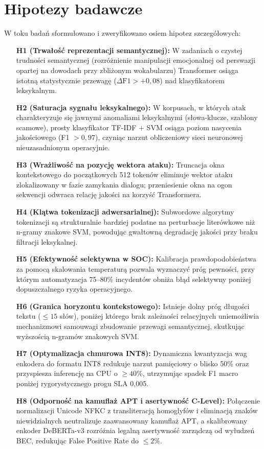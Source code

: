 \documentclass[12pt,a4paper,twoside]{report}
\begin{document}
\section{Hipotezy badawcze}
W toku badań sformułowano i zweryfikowano osiem hipotez szczegółowych:
\begin{itemize}[leftmargin=*]
  \item[\textbf{H1 (Trwałość reprezentacji semantycznej):}] W zadaniach o czystej trudności semantycznej (rozróżnienie manipulacji emocjonalnej od perswazji opartej na dowodach przy zbliżonym wokabularzu) Transformer osiąga istotną statystycznie przewagę ($\Delta \text{F1} > +0,08$) nad klasyfikatorem leksykalnym.
  \item[\textbf{H2 (Saturacja sygnału leksykalnego):}] W korpusach, w których atak charakteryzuje się jawnymi anomaliami leksykalnymi (słowa-klucze, szablony scamowe), prosty klasyfikator TF-IDF + SVM osiąga poziom nasycenia jakościowego (F1 $> 0,97$), czyniąc narzut obliczeniowy sieci neuronowej nieuzasadnionym operacyjnie.
  \item[\textbf{H3 (Wrażliwość na pozycję wektora ataku):}] Truncacja okna kontekstowego do początkowych 512 tokenów eliminuje wektor ataku zlokalizowany w fazie zamykania dialogu; przeniesienie okna na ogon sekwencji odwraca relację jakości na korzyść Transformera.
  \item[\textbf{H4 (Klątwa tokenizacji adwersarialnej):}] Subwordowe algorytmy tokenizacji są strukturalnie bardziej podatne na perturbacje literówkowe niż n-gramy znakowe SVM, powodując gwałtowną degradację jakości przy braku filtracji leksykalnej.
  \item[\textbf{H5 (Efektywność selektywna w SOC):}] Kalibracja prawdopodobieństwa za pomocą skalowania temperaturą pozwala wyznaczyć próg pewności, przy którym automatyzacja 75--80\% incydentów obniża błąd selektywny poniżej dopuszczalnego ryzyka operacyjnego.
  \item[\textbf{H6 (Granica horyzontu kontekstowego):}] Istnieje dolny próg długości tekstu ($\le 15$ słów), poniżej którego brak zależności relacyjnych uniemożliwia mechanizmowi samouwagi zbudowanie przewagi semantycznej, skutkując wyższością n-gramów znakowych SVM.
  \item[\textbf{H7 (Optymalizacja chmurowa INT8):}] Dynamiczna kwantyzacja wag enkodera do formatu INT8 redukuje narzut pamięciowy o blisko 50\% oraz przyspiesza inferencję na CPU o $\ge 40$\%, utrzymując spadek F1 macro poniżej rygorystycznego progu SLA 0,005.
  \item[\textbf{H8 (Odporność na kamuflaż APT i asertywność C-Level):}] Połączenie normalizacji Unicode NFKC z transliteracją homoglyfów i eliminacją znaków niewidzialnych neutralizuje zaawansowany kamuflaż APT, a skalibrowany enkoder DeBERTa-v3 rozróżnia legalną asertywność zarządczą od wyłudzeń BEC, redukując False Positive Rate do $\le 2\%$.
\end{itemize}
\end{document}
